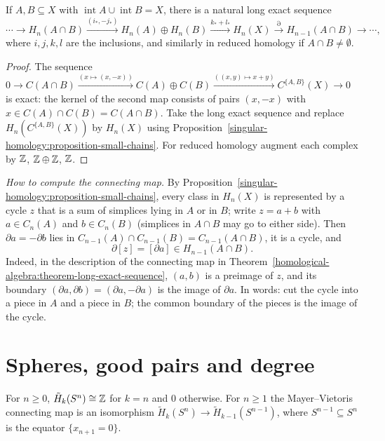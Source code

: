 \begin{theorem}\label{singular-homology:theorem-mayer-vietoris}
If $A, B \subseteq X$ with $\operatorname{int}A \cup \operatorname{int}B = X$, there is a natural long exact sequence
\[
\cdots \to H_n(A \cap B) \xrightarrow{(i_*, -j_*)} H_n(A) \oplus H_n(B) \xrightarrow{k_* + l_*} H_n(X) \xrightarrow{\partial} H_{n-1}(A \cap B) \to \cdots,
\]
where $i, j, k, l$ are the inclusions, and similarly in reduced homology if $A \cap B \neq \emptyset$.
\end{theorem}

\begin{proof}
The sequence $0 \to C(A \cap B) \xrightarrow{(x \mapsto (x, -x))} C(A) \oplus C(B) \xrightarrow{((x, y) \mapsto x + y)} C^{\{A, B\}}(X) \to 0$ is exact: the kernel of the second
map consists of pairs $(x, -x)$ with $x \in C(A) \cap C(B) = C(A \cap B)$. Take the long exact sequence and replace $H_n(C^{\{A,B\}}(X))$ by $H_n(X)$ using
Proposition~\ref{singular-homology:proposition-small-chains}. For reduced homology augment each complex by $\mathbb{Z}$, $\mathbb{Z} \oplus \mathbb{Z}$, $\mathbb{Z}$.
\end{proof}

\begin{remark}\label{singular-homology:remark-mayer-vietoris-boundary}
\emph{How to compute the connecting map.} By Proposition~\ref{singular-homology:proposition-small-chains}, every class in $H_n(X)$ is represented by a cycle $z$ that is a sum
of simplices lying in $A$ or in $B$; write $z = a + b$ with $a \in C_n(A)$ and $b \in C_n(B)$ (simplices in $A \cap B$ may go to either side). Then
$\partial a = -\partial b$ lies in $C_{n-1}(A) \cap C_{n-1}(B) = C_{n-1}(A \cap B)$, it is a cycle, and
\[
\partial[z] = [\partial a] \in H_{n-1}(A \cap B).
\]
Indeed, in the description of the connecting map in Theorem~\ref{homological-algebra:theorem-long-exact-sequence}, $(a, b)$ is a preimage of $z$, and its boundary
$(\partial a, \partial b) = (\partial a, -\partial a)$ is the image of $\partial a$. In words: cut the cycle into a piece in $A$ and a piece in $B$; the common boundary of the
pieces is the image of the cycle.
\end{remark}

\section{Spheres, good pairs and degree}\label{singular-homology:section-spheres}

\begin{theorem}\label{singular-homology:theorem-spheres}
For $n \geq 0$, $\tilde{H}_k(S^n) \cong \mathbb{Z}$ for $k = n$ and $0$ otherwise. For $n \geq 1$ the Mayer--Vietoris connecting map is an isomorphism
$\tilde{H}_k(S^n) \to \tilde{H}_{k-1}(S^{n-1})$, where $S^{n-1} \subseteq S^n$ is the equator $\{x_{n+1} = 0\}$.
\end{theorem}

